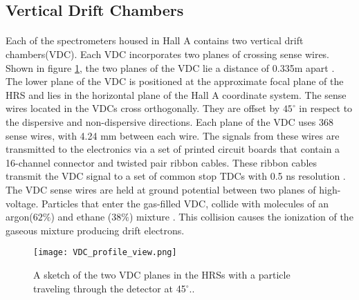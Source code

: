 	\subsection{Vertical Drift Chambers}\label{sec:vdc}
	\paragraph{}Each of the spectrometers housed in Hall A contains two vertical drift chambers(VDC). Each VDC incorporates two planes of crossing sense wires. Shown in figure \ref{VDC_profile}, the two planes of the VDC lie a distance of 0.335m apart \cite{drift}. The lower plane of the VDC is positioned at the approximate focal plane of the HRS and lies in the horizontal plane of the Hall A coordinate system. The sense wires located in the VDCs cross orthogonally. They are offset by $45^\circ$ in respect to the dispersive and non-dispersive directions. Each plane of the VDC uses 368 sense wires, with 4.24 mm between each wire. The signals from these wires are transmitted to the electronics via a set of printed circuit boards that contain a 16-channel connector and twisted pair ribbon cables. These ribbon cables transmit the VDC signal to a set of common stop TDCs with 0.5 ns resolution \cite{drift}. The VDC sense wires are held at ground potential between two planes of high-voltage. Particles that enter the gas-filled VDC, collide with molecules of an argon($62\%$) and ethane ($38\%$) mixture \cite{HallA}. This collision causes the ionization of the gaseous mixture producing drift electrons.
	\begin{figure}
		\centering
		\texttt{[image: VDC\_profile\_view.png]}
		\caption{A sketch of the two VDC planes in the HRSs with a particle traveling through the detector at 45$^\circ$.\cite{drift}.
			\label{VDC_profile}}
	\end{figure}
